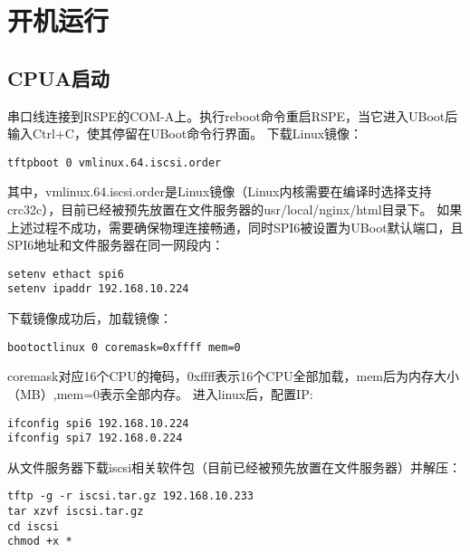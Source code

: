 \section{开机运行}
\subsection{CPUA启动}
串口线连接到RSPE的COM-A上。执行reboot命令重启RSPE，当它进入UBoot后输入Ctrl+C，使其停留在UBoot命令行界面。
下载Linux镜像：
\begin{verbatim}
tftpboot 0 vmlinux.64.iscsi.order
\end{verbatim}

其中，vmlinux.64.iscsi.order是Linux镜像（Linux内核需要在编译时选择支持crc32c），目前已经被预先放置在文件服务器的usr/local/nginx/html目录下。
如果上述过程不成功，需要确保物理连接畅通，同时SPI6被设置为UBoot默认端口，且SPI6地址和文件服务器在同一网段内：
\begin{verbatim}
setenv ethact spi6
setenv ipaddr 192.168.10.224
\end{verbatim}

下载镜像成功后，加载镜像：
\begin{verbatim}
bootoctlinux 0 coremask=0xffff mem=0
\end{verbatim}

coremask对应16个CPU的掩码，0xffff表示16个CPU全部加载，mem后为内存大小（MB）,mem=0表示全部内存。
进入linux后，配置IP:
\begin{verbatim}
ifconfig spi6 192.168.10.224
ifconfig spi7 192.168.0.224
\end{verbatim}

从文件服务器下载iscsi相关软件包（目前已经被预先放置在文件服务器）并解压：
\begin{verbatim}
tftp -g -r iscsi.tar.gz 192.168.10.233
tar xzvf iscsi.tar.gz
cd iscsi
chmod +x *
\end{verbatim}

